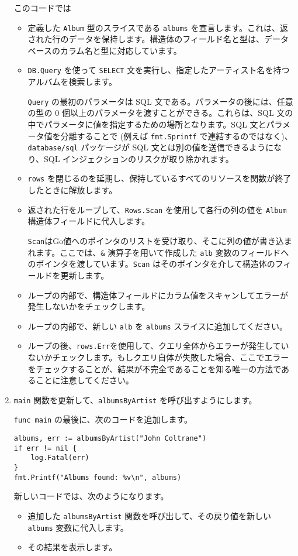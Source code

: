 \begin{enumerate}
  このコードでは

  \begin{itemize}
  \item
    定義した \texttt{Album} 型のスライスである \texttt{albums}
    を宣言します。これは、返された行のデータを保持します。構造体のフィールド名と型は、データベースのカラム名と型に対応しています。
  \item
    \texttt{DB.Query} を使って \texttt{SELECT}
    文を実行し、指定したアーティスト名を持つアルバムを検索します。

    \texttt{Query} の最初のパラメータは SQL
    文である。パラメータの後には、任意の型の 0
    個以上のパラメータを渡すことができる。これらは、SQL
    文の中でパラメータに値を指定するための場所となります。SQL
    文とパラメータ値を分離することで (例えば \texttt{fmt.Sprintf}
    で連結するのではなく)、 \texttt{database/sql} パッケージが SQL
    文とは別の値を送信できるようになり、SQL
    インジェクションのリスクが取り除かれます。
  \item
    \texttt{rows}
    を閉じるのを延期し、保持しているすべてのリソースを関数が終了したときに解放します。
  \item
    返された行をループして、\texttt{Rows.Scan} を使用して各行の列の値を
    \texttt{Album} 構造体フィールドに代入します。

    \texttt{Scan}はGo値へのポインタのリストを受け取り、そこに列の値が書き込まれます。ここでは、\texttt{\&}
    演算子を用いて作成した \texttt{alb}
    変数のフィールドへのポインタを渡しています。\texttt{Scan}
    はそのポインタを介して構造体のフィールドを更新します。
  \item
    ループの内部で、構造体フィールドにカラム値をスキャンしてエラーが発生しないかをチェックします。
  \item
    ループの内部で、新しい \texttt{alb} を \texttt{albums}
    スライスに追加してください。
  \item
    ループの後、\texttt{rows.Err}を使用して、クエリ全体からエラーが発生していないかチェックします。もしクエリ自体が失敗した場合、ここでエラーをチェックすることが、結果が不完全であることを知る唯一の方法であることに注意してください。
  \end{itemize}
\item
  \texttt{main} 関数を更新して、\texttt{albumsByArtist}
  を呼び出すようにします。

  \texttt{func\ main} の最後に、次のコードを追加します。

\begin{lstlisting}[numbers=none]
albums, err := albumsByArtist("John Coltrane")
if err != nil {
    log.Fatal(err)
}
fmt.Printf("Albums found: %v\n", albums)
\end{lstlisting}

  新しいコードでは、次のようになります。

  \begin{itemize}
  \item
    追加した \texttt{albumsByArtist}
    関数を呼び出して、その戻り値を新しい \texttt{albums}
    変数に代入します。
  \item
    その結果を表示します。
  \end{itemize}
\end{enumerate}

